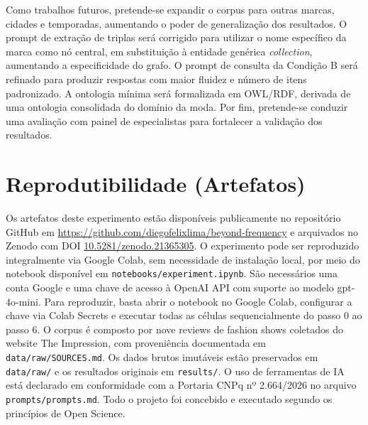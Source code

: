 \documentclass[sigconf]{acmart}
\begin{document}
Como trabalhos futuros, pretende-se expandir o corpus para outras marcas, cidades e temporadas, aumentando o poder de generalização dos resultados. O prompt de extração de triplas será corrigido para utilizar o nome específico da marca como nó central, em substituição à entidade genérica \textit{collection}, aumentando a especificidade do grafo. O prompt de consulta da Condição B será refinado para produzir respostas com maior fluidez e número de itens padronizado. A ontologia mínima será formalizada em OWL/RDF, derivada de uma ontologia consolidada do domínio da moda. Por fim, pretende-se conduzir uma avaliação com painel de especialistas para fortalecer a validação dos resultados.

\section{Reprodutibilidade (Artefatos)}
\label{sec:reproducibilidade}

Os artefatos deste experimento estão disponíveis publicamente no repositório GitHub em \url{https://github.com/diegofelixlima/beyond-frequency} e arquivados no Zenodo com DOI \href{https://doi.org/10.5281/zenodo.21365305}{10.5281/zenodo.21365305}. O experimento pode ser reproduzido integralmente via Google Colab, sem necessidade de instalação local, por meio do notebook disponível em \texttt{notebooks/experiment.ipynb}. São necessários uma conta Google e uma chave de acesso à OpenAI API com suporte ao modelo gpt-4o-mini. Para reproduzir, basta abrir o notebook no Google Colab, configurar a chave via Colab Secrets e executar todas as células sequencialmente do passo 0 ao passo 6. O corpus é composto por nove reviews de fashion shows coletados do website The Impression, com proveniência documentada em \texttt{data/raw/SOURCES.md}. Os dados brutos imutáveis estão preservados em \texttt{data/raw/} e os resultados originais em \texttt{results/}. O uso de ferramentas de IA está declarado em conformidade com a Portaria CNPq nº 2.664/2026 no arquivo \texttt{prompts/prompts.md}. Todo o projeto foi concebido e executado segundo os princípios de Open Science.


\end{document}

